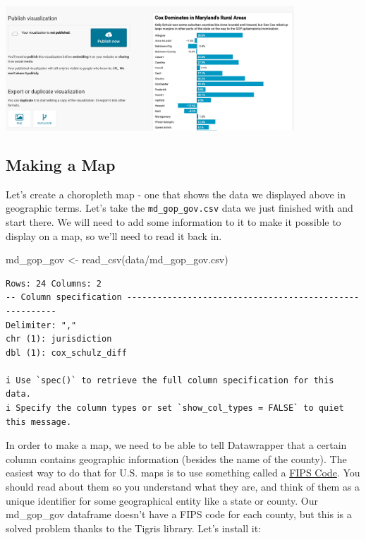 \documentclass[
  letterpaper,
  DIV=11,
  numbers=noendperiod]{scrreprt}
\newenvironment{Shaded}{\begin{snugshade}}{\end{snugshade}}
\newcommand{\FunctionTok}[1]{\textcolor[rgb]{0.28,0.35,0.67}{#1}}
\newcommand{\NormalTok}[1]{\textcolor[rgb]{0.00,0.23,0.31}{#1}}
\newcommand{\OtherTok}[1]{\textcolor[rgb]{0.00,0.23,0.31}{#1}}
\newcommand{\StringTok}[1]{\textcolor[rgb]{0.13,0.47,0.30}{#1}}
\begin{document}
\includegraphics[width=4.26in,height=\textheight]{./images/datawrapper6.png}

\hypertarget{making-a-map}{%
\subsection{Making a Map}\label{making-a-map}}

Let's create a choropleth map - one that shows the data we displayed
above in geographic terms. Let's take the \texttt{md\_gop\_gov.csv} data
we just finished with and start there. We will need to add some
information to it to make it possible to display on a map, so we'll need
to read it back in.

\begin{Shaded}
\begin{Highlighting}[]
\NormalTok{md\_gop\_gov }\OtherTok{\textless{}{-}} \FunctionTok{read\_csv}\NormalTok{(}\StringTok{\textquotesingle{}data/md\_gop\_gov.csv\textquotesingle{}}\NormalTok{)}
\end{Highlighting}
\end{Shaded}

\begin{verbatim}
Rows: 24 Columns: 2
-- Column specification --------------------------------------------------------
Delimiter: ","
chr (1): jurisdiction
dbl (1): cox_schulz_diff

i Use `spec()` to retrieve the full column specification for this data.
i Specify the column types or set `show_col_types = FALSE` to quiet this message.
\end{verbatim}

In order to make a map, we need to be able to tell Datawrapper that a
certain column contains geographic information (besides the name of the
county). The easiest way to do that for U.S. maps is to use something
called a
\href{https://www.census.gov/programs-surveys/geography/guidance/geo-identifiers.html}{FIPS
Code}. You should read about them so you understand what they are, and
think of them as a unique identifier for some geographical entity like a
state or county. Our md\_gop\_gov dataframe doesn't have a FIPS code for
each county, but this is a solved problem thanks to the Tigris library.
Let's install it:
\end{document}
